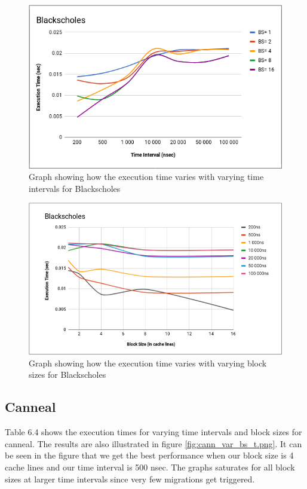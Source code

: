 \documentclass{listhesis}
\begin{document}
\begin{figure}
  \includegraphics[width=\linewidth]{Blacksc_var_bs_t.png}
  \centering
  \caption{Graph showing how the execution time varies with varying time intervals for Blackscholes}
  \label{fig:Blacksc_var_bs_t.png}
\end{figure}

\begin{figure}
  \includegraphics[width=\linewidth]{Blacksc_var_bs_fordiff_t.png}
  \centering
  \caption{Graph showing how the execution time varies with varying block sizes for Blackscholes}
  \label{fig:Blacksc_var_bs_fordiff_t.png}
\end{figure}


\subsection{Canneal}
Table 6.4 shows the execution times for varying time intervals and block sizes for canneal. The results are also illustrated in figure \ref{fig:cann_var_bs_t.png}. It can be seen in the figure that we get the best performance when our block size is 4 cache lines and our time interval is 500 nsec. The graphs saturates for all block sizes at larger time intervals since very few migrations get triggered. 
\end{document}

